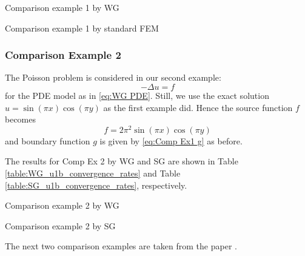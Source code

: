 		
	\begin{table}[!htbp]
	\begin{mdframed}[linecolor=red,linewidth=.5pt,roundcorner=10pt]
		\centering
		\caption{Comparison example 1 by WG}\vspace{-5pt}
		
		\label{table:WG_u1a_convergence_rates}
		\vspace{10pt}
		\caption{Comparison example 1 by standard FEM}\vspace{-5pt}
		
		\label{table:SG_u1a_convergence_rates}
	\end{mdframed}
	\end{table}\vspace{-5pt}
	
	\subsubsection*{Comparison Example 2}
	The Poisson problem is considered in our second example:
	\[-\Delta u=f\]
	for the PDE model as in \eqref{eq:WG PDE}. Still, we use the exact solution
	$u=\sin(\pi x)\cos(\pi y)$ as the first example did. Hence the source 
	function $f$ becomes
	\[ f=2\pi^2\sin(\pi x)\cos(\pi y) \]
	and boundary function $g$ is given by \eqref{eq:Comp Ex1 g} as before.
	
	The results for Comp Ex 2 by WG and SG are shown in 
	Table \ref{table:WG_u1b_convergence_rates} and 
	Table \ref{table:SG_u1b_convergence_rates}, respectively.

	\begin{table}[!htbp]
	\begin{mdframed}[linecolor=red,linewidth=.5pt,roundcorner=10pt]
		\centering
		\caption{Comparison example 2 by WG}\vspace{-5pt}
		
		\label{table:WG_u1b_convergence_rates}
		\vspace{10pt}
		\caption{Comparison example 2 by SG}\vspace{-5pt}
		
		\label{table:SG_u1b_convergence_rates}
	\end{mdframed}
	\end{table}

	The next two comparison examples are taken from the paper \cite{WG2012}.
	
